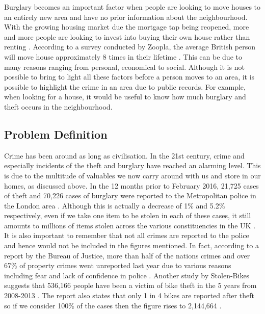 Burglary becomes an important factor when people are looking to move houses to an entirely new area and have no prior information about the neighbourhood. With the growing housing market due the mortgage tap being reopened, more and more people are looking to invest into buying their own house rather than renting \cite{BBC:HousingMarket}. According to a survey conducted by Zoopla, the average British person will move house approximately 8 times in their lifetime \cite{Zoopla:MovingStats}. This can be due to many reasons ranging from personal, economical to social. Although it is not possible to bring to light all these factors before a person moves to an area, it is possible to highlight the crime in an area due to public records. For example, when looking for a house, it would be useful to know how much burglary and theft occurs in the neighbourhood.

\subsection{Problem Definition}
Crime has been around as long as civilisation. In the 21st century, crime and especially incidents of the theft and burglary have reached an alarming level. This is due to the multitude of valuables we now carry around with us and store in our homes, as discussed above. In the 12 months prior to February 2016, 21,725 cases of theft and 70,226 cases of burglary were reported to the Metropolitan police in the London area \cite{MetPolice:CrimeFigures}. Although this is actually a decrease of 1\% and 5.2\% respectively, even if we take one item to be stolen in each of these cases, it still amounts to millions of items stolen across the various constituencies in the UK \cite{MetPolice:CrimeFigures}. It is also important to remember that not all crimes are reported to the police and hence would not be included in the figures mentioned. In fact, according to a report by the Bureau of Justice, more than half of the nations crimes and over 67\% of property crimes went unreported last year due to various reasons including fear and lack of confidence in police \cite{DOJ:UnreportedCrimes, Chronicle:UnreportedCrimes}. Another study by Stolen-Bikes suggests that 536,166 people have been a victim of bike theft in the 5 years from 2008-2013 \cite{StolenBikes:Study}. The report also states that only 1 in 4 bikes are reported after theft so if we consider 100\% of the cases then the figure rises to 2,144,664 \cite{StolenBikes:Study}.

